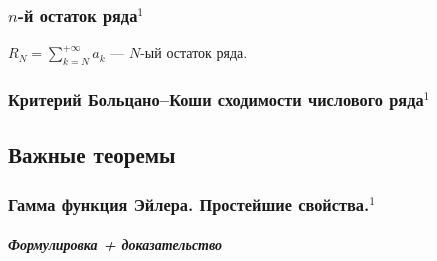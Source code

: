\documentclass{article}
\let\vanillasubparagraph\subparagraph
\renewcommand{\subparagraph}[1]{\vanillasubparagraph{#1}\mbox{}\\}
\begin{document}
\subsubsection{\texorpdfstring{$n$}{n}-й остаток ряда\texorpdfstring{$^1$}{}}
$R_N = \sum_{k=N}^{+\infty} a_k$ --- $N$-ый остаток ряда.

\subsubsection{Критерий Больцано--Коши сходимости числового ряда\texorpdfstring{$^1$}{}}

\newpage
\subsection{Важные теоремы}
\subsubsection{Гамма функция Эйлера. Простейшие свойства.\texorpdfstring{$^1$}{}}
\subparagraph{Формулировка + доказательство}
\end{document}
